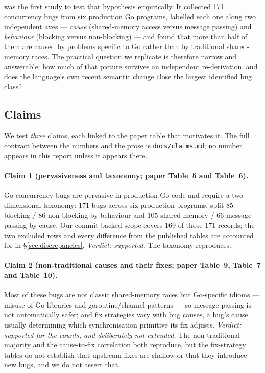 \documentclass[11pt]{article}
\begin{document}
\cite{go-study} was the first study to test that hypothesis empirically. It
collected 171 concurrency bugs from six production Go programs, labelled
each one along two independent axes --- \emph{cause} (shared-memory access
versus message passing) and \emph{behaviour} (blocking versus non-blocking)
--- and found that more than half of them are caused by problems specific to
Go rather than by traditional shared-memory races. The practical question we
replicate is therefore narrow and answerable: how much of that picture
survives an independent re-derivation, and does the language's own recent
semantic change close the largest identified bug class?

\subsection{Claims}

We test \emph{three} claims, each linked to the paper table that motivates
it. The full contract between the numbers and the prose is
\texttt{docs/claims.md}; no number appears in this report unless it appears
there.

\paragraph{Claim 1 (pervasiveness and taxonomy; paper Table~5 and
Table~6).} Go concurrency bugs are pervasive in production Go code and
require a two-dimensional taxonomy: 171 bugs across six production programs,
split 85 blocking / 86 non-blocking by behaviour and 105 shared-memory /
66 message-passing by cause. Our commit-backed scope covers 169 of those 171
records; the two excluded rows and every difference from the published tables
are accounted for in \S\ref{sec:discrepancies}.
\emph{Verdict: supported.} The taxonomy reproduces.

\paragraph{Claim 2 (non-traditional causes and their fixes; paper Table~9,
Table~7 and Table~10).} Most of these bugs are not classic shared-memory
races but Go-specific idioms --- misuse of Go libraries and goroutine/channel
patterns --- so message passing is not automatically safer; and fix
strategies vary with bug causes, a bug's cause usually determining which
synchronisation primitive its fix adjusts.
\emph{Verdict: supported for the counts, and deliberately not extended.} The
non-traditional majority and the cause-to-fix correlation both reproduce, but
the fix-strategy tables do not establish that upstream fixes are shallow or
that they introduce new bugs, and we do not assert that.
\end{document}
